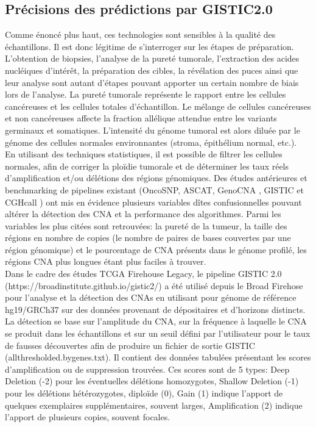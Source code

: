 \documentclass{style}
\begin{document}
\subsection{Précisions des prédictions par GISTIC2.0}
Comme énoncé plus haut, ces technologies sont sensibles à la qualité des échantillons. Il est donc légitime de s'interroger sur les étapes de préparation. L’obtention de biopsies, l’analyse de la pureté tumorale, l’extraction des acides nucléiques d’intérêt, la préparation des cibles, la révélation des puces ainsi que leur analyse sont autant d’étapes pouvant apporter un certain nombre de biais lors de l’analyse. La pureté tumorale représente le rapport entre les cellules cancéreuses et les cellules totales d’échantillon. Le mélange de cellules cancéreuses et non cancéreuses affecte la fraction allélique attendue entre les variants germinaux et somatiques. L’intensité du génome tumoral est alors diluée par le génome des cellules normales environnantes (stroma, épithélium normal, etc.). \\
En utilisant des techniques statistiques, il est possible de filtrer les cellules normales, afin de corriger la ploïdie tumorale et de déterminer les taux réels d'amplification et/ou délétions des régions génomiques. 
Des études antérieures et benchmarking de pipelines existant (OncoSNP, ASCAT, GenoCNA , GISTIC et CGHcall ) ont mis en évidence plusieurs variables dîtes confusionnelles pouvant altérer la détection des CNA et la performance des algorithmes. Parmi les variables les plus citées sont retrouvées: la pureté de la tumeur, la taille des régions en nombre de copies (le nombre de paires de bases couvertes par une région génomique) et le pourcentage de CNA présents dans le génome profilé, les régions CNA plus longues étant plus faciles à trouver. \\
Dans le cadre des études TCGA Firehouse Legacy, le pipeline GISTIC 2.0 (https://broadinstitute.github.io/gistic2/) a été utilisé depuis le Broad Firehose pour l’analyse et la détection des CNAs en utilisant pour génome de référence hg19/GRCh37 sur des données provenant de dépositaires et d'horizons distincts. \\
La détection se base sur l'amplitude du CNA, sur la fréquence à laquelle le CNA se produit dans les échantillons et sur un seuil défini par l'utilisateur pour le taux de fausses découvertes afin de produire un fichier de sortie
GISTIC (allthresholded.bygenes.txt). Il contient des données tabulées présentant les scores d'amplification ou de suppression trouvées. Ces scores sont de 5 types: Deep Deletion (-2) pour les éventuelles délétions homozygotes, Shallow Deletion (-1) pour les délétions hétérozygotes, diploïde (0), Gain (1) indique l’apport de quelques exemplaires supplémentaires, souvent larges, Amplification (2) indique l’apport de plusieurs copies, souvent focales. 
\end{document}
